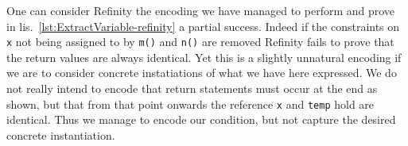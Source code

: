 One can consider Refinity the encoding we have managed to perform and prove in lis.~\ref{lst:ExtractVariable-refinity} a partial success. Indeed if the constraints on
\lstinline[style=refinity]|x| not being assigned to by \lstinline[style=refinity]|m()| and \lstinline[style=refinity]|n()| are removed Refinity fails to prove that
the return values are always identical. Yet this is a slightly unnatural encoding if we are to consider concrete instatiations of what we have here expressed. We do
not really intend to encode that return statements must occur at the end as shown, but that from that point onwards the reference \lstinline[style=refinity]|x| and
\lstinline[style=refinity]|temp| hold are identical. Thus we manage to encode our condition, but not capture the desired concrete instantiation.

